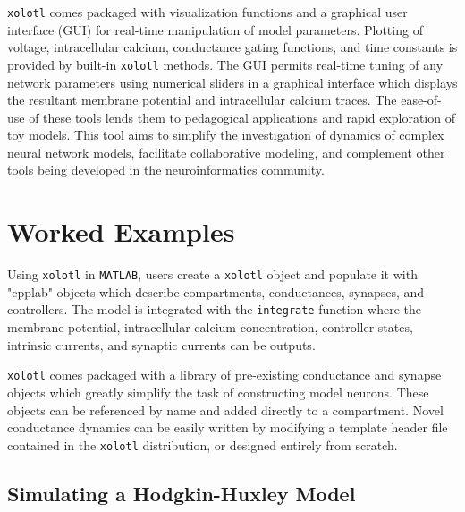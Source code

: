 \documentclass{frontiersSCNS} %
\begin{document}
\texttt{xolotl} comes packaged with visualization functions and a graphical user interface (GUI) for real-time manipulation of model parameters. Plotting of voltage, intracellular calcium, conductance gating functions, and time constants is provided by built-in \texttt{xolotl} methods. The GUI permits real-time tuning of any network parameters using numerical sliders in a graphical interface which displays the resultant membrane potential and intracellular calcium traces. The ease-of-use of these tools lends them to pedagogical applications and rapid exploration of toy models. This tool aims to simplify the investigation of dynamics of complex neural network models, facilitate collaborative modeling, and complement other tools being developed in the neuroinformatics community.


%
%
%
%
%
%

\section{Worked Examples}
\label{sec:examples}

Using \texttt{xolotl} in \texttt{MATLAB}, users create a \texttt{xolotl} object and populate it with "cpplab" objects which describe compartments, conductances, synapses, and controllers. The model is integrated with the \texttt{integrate} function where the membrane potential, intracellular calcium concentration, controller states, intrinsic currents, and synaptic currents can be outputs.

\texttt{xolotl} comes packaged with a library of pre-existing conductance and synapse objects which greatly simplify the task of constructing model neurons. These objects can be referenced by name and added directly to a compartment. Novel conductance dynamics can be easily written by modifying a template header file contained in the \texttt{xolotl} distribution, or designed entirely from scratch.

%
%
%
%
%
%

\subsection{Simulating a Hodgkin-Huxley Model}
\end{document}
